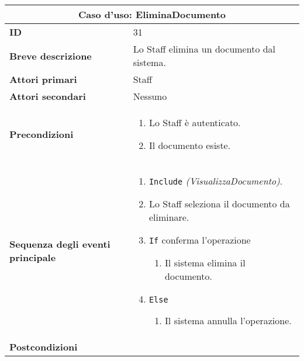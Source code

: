 \documentclass[a4paper]{report}
\begin{document}
\clearpage
\begin{table}[H]
\vspace*{-0cm}
\renewcommand{\arraystretch}{1.9}
\begin{tabular}{|p{3.9cm}|p{9.9cm}|}
\hline
\multicolumn{2}{|c|}{\textbf{Caso d’uso: EliminaDocumento}} \\ \hline
	\textbf{ID} & 31 \\ \hline
	\textbf{Breve descrizione} & Lo Staff elimina un documento dal sistema. \\ \hline
	\textbf{Attori primari} & Staff \\ \hline
	\textbf{Attori secondari} & Nessuno \\ \hline
	\textbf{Precondizioni} & \begin{enumerate}[leftmargin=14pt,label=\arabic*.,labelsep=0.5em,topsep=0pt,partopsep=0pt,parsep=0pt,itemsep=0pt]
        \item Lo Staff è autenticato.
        \item Il documento esiste.
    \end{enumerate} \\ \hline
	\textbf{Sequenza degli eventi principale} & 
\begin{enumerate}[leftmargin=14pt,label=\arabic*.,labelsep=0.5em,topsep=0pt,partopsep=0pt,parsep=0pt,itemsep=0pt]
    \item \texttt{Include} \textit{(VisualizzaDocumento)}. 
    \item Lo Staff seleziona il documento da eliminare.
    \item \texttt{If} conferma l’operazione
    \begin{enumerate}[label=\arabic{enumi}.\arabic*.,leftmargin=22pt,labelsep=0.5em,topsep=0pt,partopsep=0pt,parsep=0pt,itemsep=0pt]
        \item Il sistema elimina il documento.
    \end{enumerate}
    \item \texttt{Else}
    \begin{enumerate}[label=\arabic{enumi}.\arabic*.,leftmargin=22pt,labelsep=0.5em,topsep=0pt,partopsep=0pt,parsep=0pt,itemsep=0pt]
        \item Il sistema annulla l’operazione.
    \end{enumerate}
\end{enumerate}\\ \hline
	\textbf{Postcondizioni} & \begin{enumerate}[leftmargin=14pt,label=\arabic*.,labelsep=0.5em,topsep=0pt,partopsep=0pt,parsep=0pt,itemsep=0pt]

\end{enumerate}
\end{tabular}
\end{table}
\end{document}
